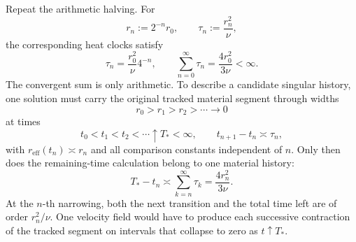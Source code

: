 
Repeat the arithmetic halving. For
\[
  r_n:=2^{-n}r_0,
  \qquad
  \tau_n:=\frac{r_n^2}{\nu},
\]
the corresponding heat clocks satisfy
\[
  \tau_n
  =
  \frac{r_0^2}{\nu}4^{-n},
  \qquad
  \sum_{n=0}^{\infty}\tau_n
  =
  \frac{4r_0^2}{3\nu}
  <
  \infty.
\]
The convergent sum is only arithmetic. To describe a candidate singular history, one \NavierStokes{} solution must carry the original tracked material segment through widths
\[
  r_0>r_1>r_2>\cdots\longrightarrow0
\]
at times
\[
  t_0<t_1<t_2<\cdots\uparrow T_*<\infty,
  \qquad
  t_{n+1}-t_n\asymp\tau_n,
\]
with $r_{\mathrm{eff}}(t_n)\asymp r_n$ and all comparison constants independent of $n$. Only then does the remaining-time calculation belong to one material history:
\[
  T_*-t_n
  \asymp
  \sum_{k=n}^{\infty}\tau_k
  =
  \frac{4r_n^2}{3\nu}.
\]
At the $n$-th narrowing, both the next transition and the total time left are of order $r_n^2/\nu$. One velocity field would have to produce each successive contraction of the tracked segment on intervals that collapse to zero as $t\uparrow T_*$.
